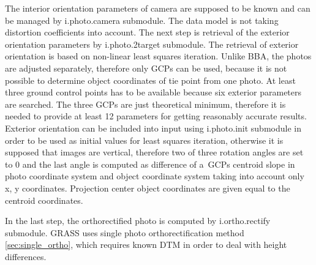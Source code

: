 \documentclass[a4paper,12pt]{article}
\begin{document}
The interior orientation parameters of camera are supposed to be known and can 
be managed by i.photo.camera submodule.
The data model is not taking distortion 
coefficients into account. 
The next step is retrieval of the exterior orientation parameters by i.photo.2target submodule.  
The retrieval 
of exterior orientation is based on non-linear least squares iteration. Unlike BBA,
the photos are adjusted separately, therefore only GCPs can be used,
because it is not possible to determine object coordinates of tie point from one photo.
At least three ground control points has to be available because six exterior parameters are 
searched. The three GCPs are just theoretical minimum, therefore it is needed to provide at least 12 parameters
for getting reasonably accurate results. Exterior orientation 
can be included into input using i.photo.init submodule in order to be used as initial values for least squares iteration,
otherwise it is supposed that images are vertical, therefore two of three rotation
angles are set to 0 and the last angle is computed as difference of a~GCPs centroid  slope
in photo coordinate system and object coordinate system taking into account only x, y coordinates.
Projection center object coordinates are given equal to the centroid coordinates.

In the last step, the orthorectified photo is computed by i.ortho.rectify submodule. GRASS uses single photo orthorectification
method \ref{sec:single_ortho}, which requires known DTM in order to deal with height differences. 
\end{document}

